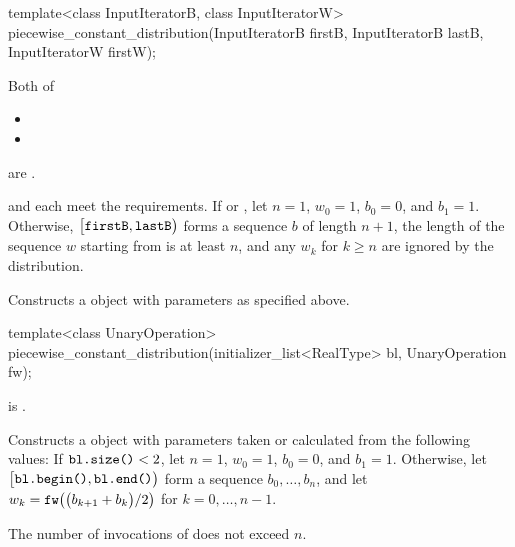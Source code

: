 %
\begin{itemdecl}
template<class InputIteratorB, class InputIteratorW>
 piecewise_constant_distribution(InputIteratorB firstB, InputIteratorB lastB,
                                 InputIteratorW firstW);
\end{itemdecl}

\begin{itemdescr}
\pnum
\mandates
Both of
\begin{itemize}
\item{}
\item{}
\end{itemize}
are .

\pnum
\expects
   and 
   each meet the
   requirements.
 If 
 or ,
 let $n = 1$,
     $w_0 = 1$,
     $b_0 = 0$,
 and $b_1 = 1$.
 Otherwise,
 $\bigl[\texttt{\protect firstB}, \texttt{\protect lastB}\bigr)$
 forms a sequence $b$ of length $n+1$,
 the length of the sequence $w$ starting from 
 is at least $n$,
 and any $w_k$ for  $k \geq n$ are ignored by the distribution.

\pnum
\effects
Constructs a  object
 with parameters as specified above.
\end{itemdescr}


%
\begin{itemdecl}
template<class UnaryOperation>
 piecewise_constant_distribution(initializer_list<RealType> bl, UnaryOperation fw);
\end{itemdecl}

\begin{itemdescr}
\pnum
\mandates
{} is .

\pnum
\effects
Constructs a  object
 with parameters taken or calculated
 from the following values:
 If $\texttt{\protect bl.size()} < 2$,
 let $n = 1$,
     $w_0 = 1$,
     $b_0 = 0$,
 and $b_1 = 1$.
 Otherwise,
 let $\bigl[\texttt{\protect bl.begin()}, \texttt{\protect bl.end()}\bigr)$
 form a sequence $b_0, \dotsc, b_n$,
 and
 let $w_k = \texttt{\protect fw}\bigl(\bigl(b_{k+1} + b_k\bigr) / 2\bigr)$
 for $k = 0, \dotsc, n - 1$.

\pnum
\complexity
The number of invocations of  does not exceed $n$.
\end{itemdescr}


